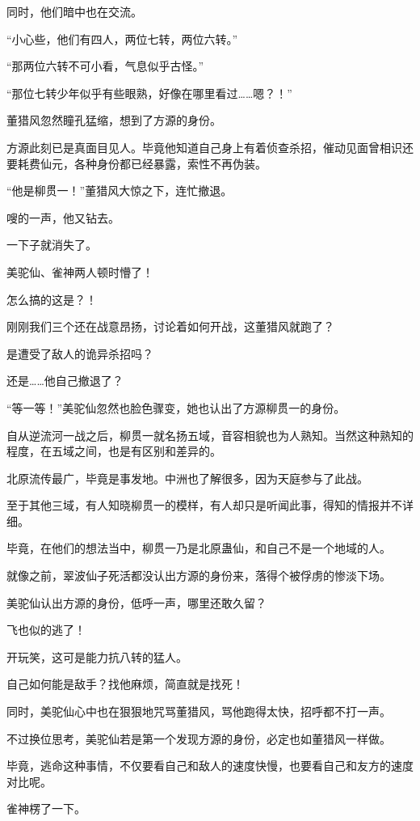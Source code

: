 \begin{this_body}
同时，他们暗中也在交流。

“小心些，他们有四人，两位七转，两位六转。”

“那两位六转不可小看，气息似乎古怪。”

“那位七转少年似乎有些眼熟，好像在哪里看过……嗯？！”

董猎风忽然瞳孔猛缩，想到了方源的身份。

方源此刻已是真面目见人。毕竟他知道自己身上有着侦查杀招，催动见面曾相识还要耗费仙元，各种身份都已经暴露，索性不再伪装。

“他是柳贯一！”董猎风大惊之下，连忙撤退。

嗖的一声，他又钻去。

一下子就消失了。

美驼仙、雀神两人顿时懵了！

怎么搞的这是？！

刚刚我们三个还在战意昂扬，讨论着如何开战，这董猎风就跑了？

是遭受了敌人的诡异杀招吗？

还是……他自己撤退了？

“等一等！”美驼仙忽然也脸色骤变，她也认出了方源柳贯一的身份。

自从逆流河一战之后，柳贯一就名扬五域，音容相貌也为人熟知。当然这种熟知的程度，在五域之间，也是有区别和差异的。

北原流传最广，毕竟是事发地。中洲也了解很多，因为天庭参与了此战。

至于其他三域，有人知晓柳贯一的模样，有人却只是听闻此事，得知的情报并不详细。

毕竟，在他们的想法当中，柳贯一乃是北原蛊仙，和自己不是一个地域的人。

就像之前，翠波仙子死活都没认出方源的身份来，落得个被俘虏的惨淡下场。

美驼仙认出方源的身份，低呼一声，哪里还敢久留？

飞也似的逃了！

开玩笑，这可是能力抗八转的猛人。

自己如何能是敌手？找他麻烦，简直就是找死！

同时，美驼仙心中也在狠狠地咒骂董猎风，骂他跑得太快，招呼都不打一声。

不过换位思考，美驼仙若是第一个发现方源的身份，必定也如董猎风一样做。

毕竟，逃命这种事情，不仅要看自己和敌人的速度快慢，也要看自己和友方的速度对比呢。

雀神楞了一下。


\end{this_body}

